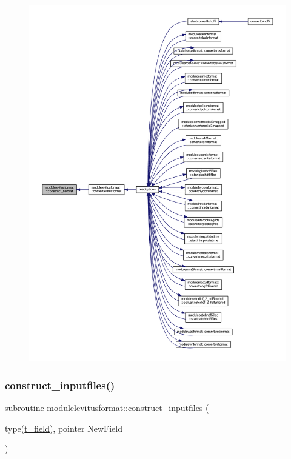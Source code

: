 \begin{figure}[H]
\begin{center}
\leavevmode
\includegraphics[width=350pt]{namespacemodulelevitusformat_a283a6fb7f680ba1855b1e20b95906146_icgraph}
\end{center}
\end{figure}
\mbox{\label{namespacemodulelevitusformat_a3771e94f5b1b7829553eba0cea20546a}} 
\subsubsection{\texorpdfstring{construct\+\_\+inputfiles()}{construct\_inputfiles()}}
{\footnotesize\ttfamily subroutine modulelevitusformat\+::construct\+\_\+inputfiles (\begin{DoxyParamCaption}\item[{type(\mbox{\hyperlink{structmodulelevitusformat_1_1t__field}{t\+\_\+field}}), pointer}]{New\+Field }\end{DoxyParamCaption})\hspace{0.3cm}{\ttfamily [private]}}

